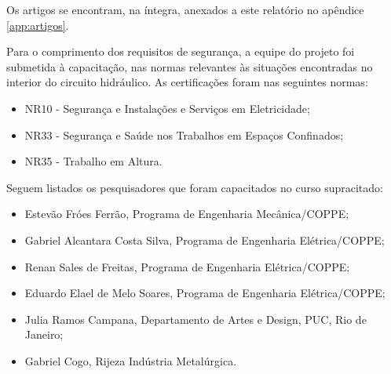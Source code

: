 Os artigos se encontram, na íntegra, anexados a este relatório no apêndice
\ref{app:artigos}.



Para o comprimento dos requisitos de segurança, a equipe do projeto foi submetida à capacitação, nas
normas relevantes às situações encontradas no interior do circuito hidráulico. As certificações foram nas
seguintes normas:

\begin{itemize}
  \item NR10 - Segurança e Instalações e Serviços em Eletricidade;
  \item NR33 - Segurança e Saúde nos Trabalhos em Espaços Confinados;
  \item NR35 - Trabalho em Altura.
\end{itemize}

Seguem listados os pesquisadores que foram capacitados no curso
supracitado:

\begin{itemize}
  \item Estevão Fróes Ferrão, Programa de Engenharia Mecânica/COPPE;
  \item Gabriel Alcantara Costa Silva, Programa de Engenharia Elétrica/COPPE;
  \item Renan Sales de Freitas, Programa de Engenharia Elétrica/COPPE;
  \item Eduardo Elael de Melo Soares, Programa de Engenharia Elétrica/COPPE;
  \item Julia Ramos Campana, Departamento de Artes e Design, PUC, Rio de
  Janeiro;
  \item Gabriel Cogo, Rijeza Indústria Metalúrgica.
\end{itemize}

% 

